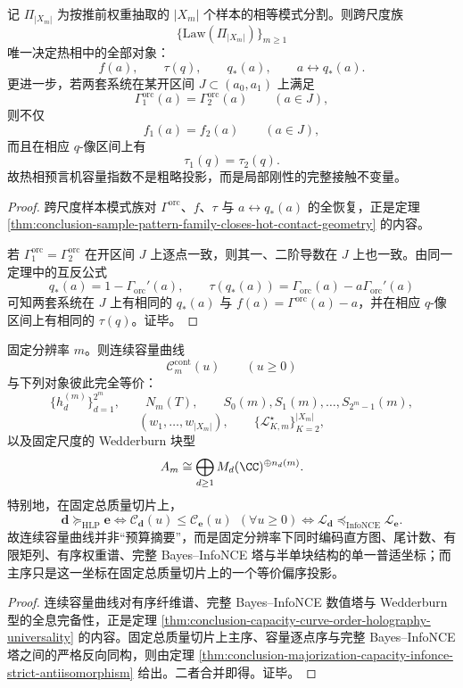 \begin{theorem}\label{thm:conclusion-sample-pattern-hot-contact-local-rigidity}
记 \(\Pi_{|X_m|}\) 为按推前权重抽取的 \(|X_m|\) 个样本的相等模式分割。则跨尺度族
\[
\{\mathrm{Law}(\Pi_{|X_m|})\}_{m\ge 1}
\]
唯一决定热相中的全部对象：
\[
f(a),\qquad
\tau(q),\qquad
q_\ast(a),\qquad
a\longleftrightarrow q_\ast(a).
\]
更进一步，若两套系统在某开区间 \(J\subset(a_0,a_1)\) 上满足
\[
\Gamma^{\mathrm{orc}}_1(a)=\Gamma^{\mathrm{orc}}_2(a)
\qquad(a\in J),
\]
则不仅
\[
f_1(a)=f_2(a)
\qquad(a\in J),
\]
而且在相应 \(q\)-像区间上有
\[
\tau_1(q)=\tau_2(q).
\]
故热相预言机容量指数不是粗略投影，而是局部刚性的完整接触不变量。
\end{theorem}
\begin{proof}
跨尺度样本模式族对 \(\Gamma^{\mathrm{orc}}\)、\(f\)、\(\tau\) 与 \(a\leftrightarrow q_\ast(a)\) 的全恢复，正是定理 \ref{thm:conclusion-sample-pattern-family-closes-hot-contact-geometry} 的内容。

若 \(\Gamma^{\mathrm{orc}}_1=\Gamma^{\mathrm{orc}}_2\) 在开区间 \(J\) 上逐点一致，则其一、二阶导数在 \(J\) 上也一致。由同一定理中的互反公式
\[
q_\ast(a)=1-\Gamma_{\mathrm{orc}}'(a),
\qquad
\tau(q_\ast(a))=\Gamma_{\mathrm{orc}}(a)-a\Gamma_{\mathrm{orc}}'(a)
\]
可知两套系统在 \(J\) 上有相同的 \(q_\ast(a)\) 与 \(f(a)=\Gamma^{\mathrm{orc}}(a)-a\)，并在相应 \(q\)-像区间上有相同的 \(\tau(q)\)。证毕。
\end{proof}

\begin{theorem}\label{thm:conclusion-capacity-holography-majorization-infonce-universal-object}
固定分辨率 \(m\)。则连续容量曲线
\[
\mathcal C_m^{\mathrm{cont}}(u)\qquad(u\ge 0)
\]
与下列对象彼此完全等价：
\[
\{h_d^{(m)}\}_{d=1}^{2^m},
\qquad
N_m(T),
\qquad
S_0(m),S_1(m),\dots,S_{2^m-1}(m),
\]
\[
(w_1,\dots,w_{|X_m|}),
\qquad
\{\mathcal L_{K,m}^{\star}\}_{K=2}^{|X_m|},
\]
以及固定尺度的 Wedderburn 块型
\[
A_m\cong \bigoplus_{d\ge 1}M_d(\CC)^{\oplus n_d(m)}.
\]
特别地，在固定总质量切片上，
\[
\mathbf d\succcurlyeq_{\mathrm{HLP}}\mathbf e
\iff
\mathcal C_{\mathbf d}(u)\le \mathcal C_{\mathbf e}(u)\ \ (\forall u\ge 0)
\iff
\mathscr L_{\mathbf d}\preccurlyeq_{\mathrm{InfoNCE}}\mathscr L_{\mathbf e}.
\]
故连续容量曲线并非“预算摘要”，而是固定分辨率下同时编码直方图、尾计数、有限矩列、有序权重谱、完整 Bayes--InfoNCE 塔与半单块结构的单一普适坐标；而主序只是这一坐标在固定总质量切片上的一个等价偏序投影。
\end{theorem}
\begin{proof}
连续容量曲线对有序纤维谱、完整 Bayes--InfoNCE 数值塔与 Wedderburn 型的全息完备性，正是定理 \ref{thm:conclusion-capacity-curve-order-holography-universality} 的内容。固定总质量切片上主序、容量逐点序与完整 Bayes--InfoNCE 塔之间的严格反向同构，则由定理 \ref{thm:conclusion-majorization-capacity-infonce-strict-antiisomorphism} 给出。二者合并即得。证毕。
\end{proof}

